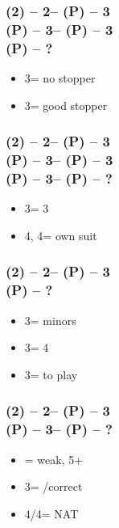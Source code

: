 \documentclass[12pt, a4paper]{article}
\begin{document}
\subsubsection*{(2\hearts) -- 2\nt -- (P) -- 3\clubs \\
                (P) -- 3\diams -- (P) -- 3\hearts \\
                (P) -- ?}
\begin{itemize}
    \item 3\spades = no \hearts stopper
    \item 3\nt = good \hearts stopper
\end{itemize}

\subsubsection*{(2\hearts) -- 2\nt -- (P) -- 3\clubs \\
                (P) -- 3\diams -- (P) -- 3\hearts \\
                (P) -- 3\spades -- (P) -- ?}
\begin{itemize}
    \item 3\nt = 3\spades
    \item 4\clubs, 4\diams = own suit
\end{itemize}

\subsubsection*{(2\hearts) -- 2\nt -- (P) -- 3\diams \\
                (P) -- ?}
\begin{itemize}
    \item 3\hearts = minors
    \item 3\spades = 4\spades
    \item 3\nt = to play
\end{itemize}

\subsubsection*{(2\hearts) -- 2\nt -- (P) -- 3\hearts \\
                (P) -- 3\spades -- (P) -- ?}
\begin{itemize}
    \item \pass = weak, 5+\spades
    \item 3\nt = \pass/correct
    \item 4\clubs/4\diams = NAT
\end{itemize}
\end{document}
